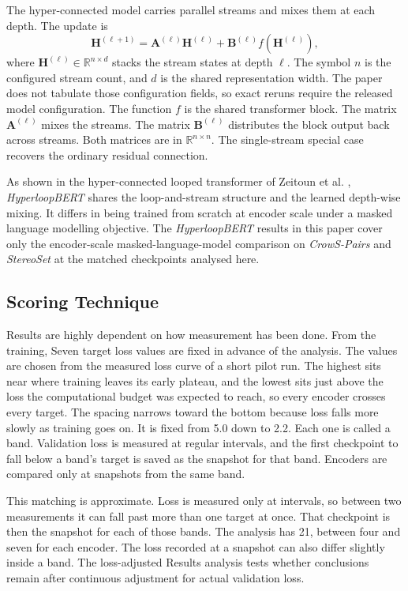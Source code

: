 \documentclass[sigconf,natbib=true,anonymous=true]{acmart}
\begin{document}
The hyper-connected model carries parallel streams and mixes them at each depth.
The update is
%
\begin{equation}
\mathbf{H}^{(\ell+1)} = \mathbf{A}^{(\ell)}\mathbf{H}^{(\ell)}
                      + \mathbf{B}^{(\ell)} f\!\left(\mathbf{H}^{(\ell)}\right),
\end{equation}
%
where $\mathbf{H}^{(\ell)} \in \mathbb{R}^{n \times d}$ stacks the stream states
at depth $\ell$. The symbol $n$ is the configured stream count, and $d$ is the
shared representation width. The paper does not tabulate those configuration
fields, so exact reruns require the released model configuration. The function
$f$ is the shared transformer block. The matrix $\mathbf{A}^{(\ell)}$ mixes the
streams. The matrix $\mathbf{B}^{(\ell)}$ distributes the block output back
across streams. Both matrices are in $\mathbb{R}^{n \times n}$. The
single-stream special case recovers the ordinary residual connection.

As shown in the hyper-connected looped transformer of
Zeitoun et al. \citep{zeitoun2026hyperloop}, \emph{HyperloopBERT} shares the loop-and-stream
structure and the learned depth-wise mixing. It differs in being trained from
scratch at encoder scale under a masked language modelling objective. The
\emph{HyperloopBERT} results in this paper cover only the
encoder-scale masked-language-model comparison on \emph{CrowS-Pairs} and
\emph{StereoSet} at the matched checkpoints analysed here. 

\subsection{Scoring Technique}

Results are highly dependent on how measurement has been done. From the training, Seven target loss values are fixed in advance of the analysis. The values are chosen from the measured loss curve of a short pilot run. The
highest sits near where training leaves its early plateau, and the lowest sits
just above the loss the computational budget was expected to reach, so every encoder crosses
every target. The spacing narrows toward the bottom because loss falls more slowly as training goes on.
It is fixed from 5.0 down to 2.2. Each one is called a band. Validation loss is measured at regular intervals, and the
first checkpoint to fall below a band's target is saved as the snapshot for that
band. Encoders are compared only at snapshots from the same band.

This matching is approximate. Loss is measured only at intervals, so between two
measurements it can fall past more than one target at once. That checkpoint is
then the snapshot for each of those bands. The analysis has 21, between four and seven for
each encoder. The loss recorded at a snapshot can also differ slightly inside a
band. The loss-adjusted Results analysis tests whether conclusions remain after
continuous adjustment for actual validation loss.
\end{document}
